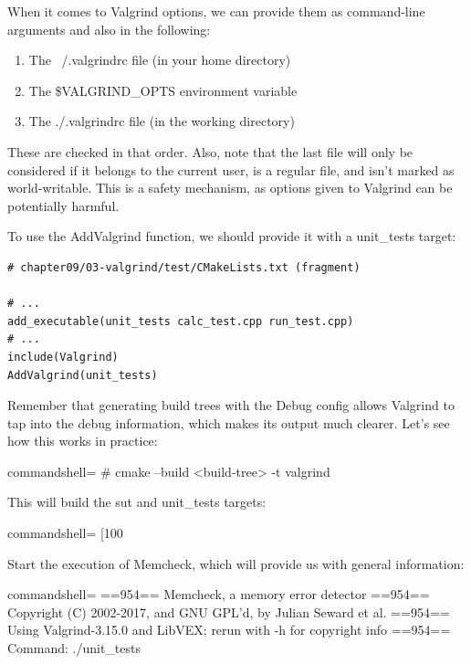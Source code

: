 When it comes to Valgrind options, we can provide them as command-line arguments and also in the following:

\begin{enumerate}
\item 
The ~/.valgrindrc file (in your home directory)

\item 
The \$VALGRIND\_OPTS environment variable

\item 
The ./.valgrindrc file (in the working directory)
\end{enumerate}

These are checked in that order. Also, note that the last file will only be considered if it belongs to the current user, is a regular file, and isn't marked as world-writable. This is a safety mechanism, as options given to Valgrind can be potentially harmful.

To use the AddValgrind function, we should provide it with a unit\_tests target:

\begin{lstlisting}[style=styleCMake]
# chapter09/03-valgrind/test/CMakeLists.txt (fragment)

# ...
add_executable(unit_tests calc_test.cpp run_test.cpp)
# ...
include(Valgrind)
AddValgrind(unit_tests)
\end{lstlisting}

Remember that generating build trees with the Debug config allows Valgrind to tap into the debug information, which makes its output much clearer. Let's see how this works in practice:

\begin{tcblisting}{commandshell={}}
# cmake --build <build-tree> -t valgrind
\end{tcblisting}

This will build the sut and unit\_tests targets:

\begin{tcblisting}{commandshell={}}
[100%
\end{tcblisting}

Start the execution of Memcheck, which will provide us with general information:

\begin{tcblisting}{commandshell={}}
==954== Memcheck, a memory error detector
==954== Copyright (C) 2002-2017, and GNU GPL'd, by Julian
Seward et al.
==954== Using Valgrind-3.15.0 and LibVEX; rerun with -h for
copyright info
==954== Command: ./unit_tests
\end{tcblisting}

